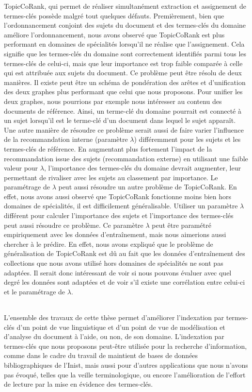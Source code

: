     TopicCoRank, qui permet de réaliser simultanément extraction et assignement
    de termes-clés possède malgré tout quelques défauts. Premièrement, bien que
    l'ordonnancement conjoint des sujets du document et des termes-clés du
    domaine améliore l'ordonnancement, nous avons observé que TopicCoRank est
    plus performant en domaines de spécialités lorsqu'il ne réalise que
    l'assignement. Cela signifie que les termes-clés du domaine sont
    correctement identifiés parmi tous les termes-clés de celui-ci, mais que
    leur importance est trop faible comparée à celle qui est attribuée aux
    sujets du document. Ce problème peut être résolu de deux manières. Il existe
    peut être un schéma de pondération des arêtes et d'unification des deux
    graphes plus performant que celui que nous proposons. Pour unifier les deux
    graphes, nous pourrions par exemple nous intéresser au contenu des documents
    de référence. Ainsi, un terme-clé du domaine pourrait est connecté à un
    sujet lorsqu'il est le terme-clé d'un document dans lequel le sujet
    apparaît. Une autre manière de résoudre ce problème serait aussi de faire
    varier l'influence de la recommandation interne (paramètre $\lambda$)
    différemment pour les sujets et les termes-clés de référence. En augmentant
    plus fortement l'impact de la recommandation issue des sujets
    (recommandation externe) en utilisant une faible valeur pour $\lambda$,
    l'importance des termes-clés du domaine devrait augmenter, leur permettant
    de rivaliser avec les sujets au classement par importance. Le paramétrage de
    $\lambda$ peut aussi résoudre un autre problème de TopicCoRank. En effet,
    nous avons aussi observé que TopicCoRank fonctionne moins bien hors domaines
    de spécialités, il est difficilement généralisable. Utiliser un paramètre
    $\lambda$ différent pour calculer l'importance des sujets et l'importance
    des termes-clés peut aussi résoudre ce problème. Ce paramètre $\lambda$ peut
    être paramétré empiriquement avec les données d'entraînement, mais nous
    aimerions aussi chercher à le prédire. En effet, nous avons expliqué que le
    problème de généralisation de TopicCoRank est dû au fait que les données
    d'entraînement des collections que nous avons utilisé hors domaines de
    spécialités ne sont pas adaptées. Il serait donc intéressant de voir si nous
    pouvons évaluer avec quel degré les données sont adaptées et de voir s'il
    existe une corrélation entre celui-ci et le paramétrage de $\lambda$.

    ~\\L'ensemble des travaux de cette thèse permet d'améliorer l'indexation par
    termes-clés d'un point de vue linguistique et  d'un point de vue de
    modélisation et d'analyse du document à l'aide, ou non, de son domaine.
    L'indexation par termes-clés que nous proposons peut-être utilisée pour la
    recherche d'information, comme dans le cadre du travail de maintient de
    bases de données bibliographiques de l'Inist, mais aussi pour d'autres
    applications que nous n'avons pas évoqué, telles que la veille
    terminologique, ou encore l'amélioration de l'effort de lecture par la mise
    en évidence des termes-clés.

